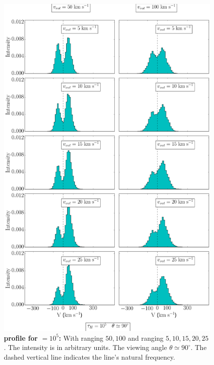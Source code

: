 \begin{figure}[h!]
	\begin{center}
		\includegraphics[height=0.85\textheight]{./figures/chapter3/3_tau10E5_phi83-90}
	\end{center}
	\caption{\textbf{\lya profile for \tauh$=10^5$:} With \vrot ranging $50,100$ \kms and \vout ranging $5,10,15,20,25$ \kms. The intensity is in arbitrary units. The viewing angle $\theta \simeq 90^\circ$. The dashed vertical line indicates the \lya line's natural frequency. 
		\label{fig:3_tau10E5_phi83-90}}
\end{figure}

\newpage

